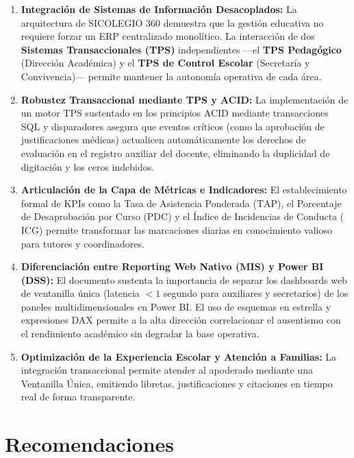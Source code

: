 \documentclass[12pt,a4paper,oneside]{report}
\begin{document}
    \begin{enumerate}
        \item \textbf{Integración de Sistemas de Información Desacoplados:} La arquitectura de SICOLEGIO 360 demuestra que la gestión educativa no requiere forzar un ERP centralizado monolítico. La interacción de dos \textbf{Sistemas Transaccionales (TPS)} independientes —el \textbf{TPS Pedagógico} (Dirección Académica) y el \textbf{TPS de Control Escolar} (Secretaría y Convivencia)— permite mantener la autonomía operativa de cada área.
        \item \textbf{Robustez Transaccional mediante TPS y ACID:} La implementación de un motor TPS sustentado en los principios ACID mediante transacciones SQL y disparadores asegura que eventos críticos (como la aprobación de justificaciones médicas) actualicen automáticamente los derechos de evaluación en el registro auxiliar del docente, eliminando la duplicidad de digitación y los ceros indebidos.
        \item \textbf{Articulación de la Capa de Métricas e Indicadores:} El establecimiento formal de KPIs como la Tasa de Asistencia Ponderada ($\text{TAP}$), el Porcentaje de Desaprobación por Curso ($\text{PDC}$) y el Índice de Incidencias de Conducta ($\text{ICG}$) permite transformar las marcaciones diarias en conocimiento valioso para tutores y coordinadores.
        \item \textbf{Diferenciación entre Reporting Web Nativo (MIS) y Power BI (DSS):} El documento sustenta la importancia de separar los dashboards web de ventanilla única (latencia $<1$ segundo para auxiliares y secretarios) de los paneles multidimensionales en Power BI. El uso de esquemas en estrella y expresiones DAX permite a la alta dirección correlacionar el ausentismo con el rendimiento académico sin degradar la base operativa.
        \item \textbf{Optimización de la Experiencia Escolar y Atención a Familias:} La integración transaccional permite atender al apoderado mediante una Ventanilla Única, emitiendo libretas, justificaciones y citaciones en tiempo real de forma transparente.
    \end{enumerate}

    \chapter*{Recomendaciones}
\end{document}
